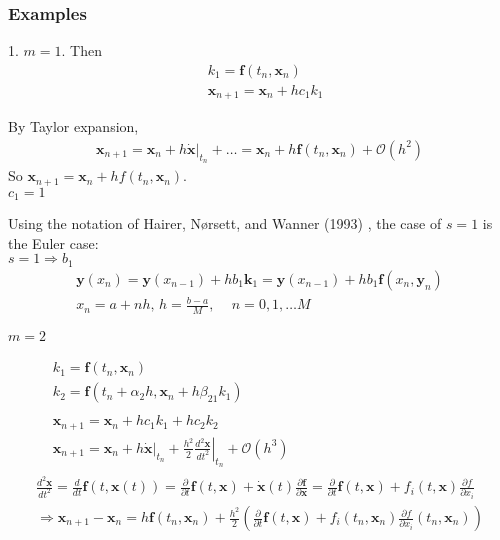 \documentclass[10pt]{amsart}
\begin{document}
\begin{multicols*}{2}
\subsubsection{Examples}

1. $m = 1$. Then 
\[
\begin{aligned}
	& k_1 = \mathbf{f}(t_n, \mathbf{x}_n) \\
	& \mathbf{x}_{n+1} = \mathbf{x}_n + hc_1 k_1
\end{aligned}
\]

By Taylor expansion,
\[
\begin{gathered}
	\mathbf{x}_{n+1} = \mathbf{x}_n + h \left. \dot{\mathbf{x}} \right|_{t_n} + \dots = \mathbf{x}_n + h \mathbf{f}(t_n, \mathbf{x}_n) + \mathcal{O}(h^2)
\end{gathered}
\]
So $\mathbf{x}_{n+1} = \mathbf{x}_n + h f(t_n, \mathbf{x}_n)$.  \\

$c_1= 1$ 

Using the notation of Hairer, N\o rsett, and Wanner (1993) \cite{HNW1993}, the case of $s=1$ is the Euler case: \\
$s=1 \Longrightarrow b_1$ \\

\[
\begin{gathered}
	\mathbf{y}(x_n) = \mathbf{y}(x_{n-1}) + h b_1 \mathbf{k}_1 = \mathbf{y}(x_{n-1}) + hb_1 \mathbf{f}(x_n, \mathbf{y}_n) \\
	x_n = a +nh, \, h = \frac{b-a}{M}, \quad \, n = 0,1, \dots M
\end{gathered}
\]


$m=2$

\[
\begin{gathered}
	\begin{aligned}
		& k_1 = \mathbf{f}(t_n, \mathbf{x}_n) \\
		& k_2 = \mathbf{f}(t_n + \alpha_2 h, \mathbf{x}_n + h \beta_{21} k_1)
	\end{aligned} \\
\begin{aligned}
	& \mathbf{x}_{n+1} = \mathbf{x}_n + hc_1 k_1 + hc_2 k_2 \\
	& \mathbf{x}_{n+1} = \mathbf{x}_n + h \left. \dot{ \mathbf{x}} \right|_{t_n} + \frac{h^2}{2} \left. \frac{d^2 \mathbf{x}}{ dt^2} \right|_{t_n} + \mathcal{O}(h^3)
\end{aligned} \\
\frac{d^2 \mathbf{x}}{dt^2} = \frac{d}{dt} \mathbf{f}(t, \mathbf{x}(t)) = \frac{\partial}{\partial t} \mathbf{f}(t, \mathbf{x}) + \dot{ \mathbf{x}}(t) \frac{\partial \mathbf{f}}{\partial \mathbf{x}} = \frac{ \partial }{ \partial t} \mathbf{f}(t, \mathbf{x}) + f_i(t,\mathbf{x}) \frac{\partial f}{ \partial x_i} \\
\Longrightarrow \mathbf{x}_{n+1} - \mathbf{x}_n = h \mathbf{f}(t_n , \mathbf{x}_n) + \frac{h^2}{2} \left( \frac{\partial }{ \partial t} \mathbf{f}(t, \mathbf{x}) + f_i(t_n , \mathbf{x}_n) \frac{\partial f}{ \partial x_i}(t_n,\mathbf{x}_n) \right)
\end{gathered}
\]


\end{multicols*}
\end{document}

